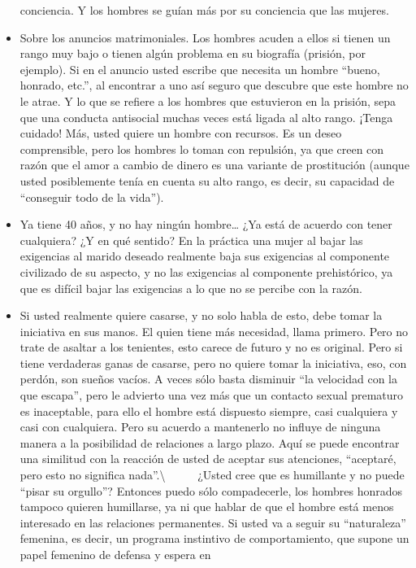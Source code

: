 \begin{itemize}
  conciencia. Y los hombres se guían más por su conciencia que las
  mujeres.
\item
  Sobre los anuncios matrimoniales. Los hombres acuden a ellos si tienen
  un rango muy bajo o tienen algún problema en su biografía (prisión,
  por ejemplo). Si en el anuncio usted escribe que necesita un hombre
  ``bueno, honrado, etc.'', al encontrar a uno así seguro que descubre
  que este hombre no le atrae. Y lo que se refiere a los hombres que
  estuvieron en la prisión, sepa que una conducta antisocial muchas
  veces está ligada al alto rango. ¡Tenga cuidado! Más, usted quiere un
  hombre con recursos. Es un deseo comprensible, pero los hombres lo
  toman con repulsión, ya que creen con razón que el amor a cambio de
  dinero es una variante de prostitución (aunque usted posiblemente
  tenía en cuenta su alto rango, es decir, su capacidad de ``conseguir
  todo de la vida'').
\item
  Ya tiene 40 años, y no hay ningún hombre\ldots{} ¿Ya está de acuerdo
  con tener cualquiera? ¿Y en qué sentido? En la práctica una mujer al
  bajar las exigencias al marido deseado realmente baja sus exigencias
  al componente civilizado de su aspecto, y no las exigencias al
  componente prehistórico, ya que es difícil bajar las exigencias a lo
  que no se percibe con la razón.
\item
  Si usted realmente quiere casarse, y no solo habla de esto, debe tomar
  la iniciativa en sus manos. El quien tiene más necesidad, llama
  primero. Pero no trate de asaltar a los tenientes, esto carece de
  futuro y no es original. Pero si tiene verdaderas ganas de casarse,
  pero no quiere tomar la iniciativa, eso, con perdón, son sueños
  vacíos. A veces sólo basta disminuir ``la velocidad con la que
  escapa'', pero le advierto una vez más que un contacto sexual
  prematuro es inaceptable, para ello el hombre está dispuesto siempre,
  casi cualquiera y casi con cualquiera. Pero su acuerdo a mantenerlo no
  influye de ninguna manera a la posibilidad de relaciones a largo
  plazo. Aquí se puede encontrar una similitud con la reacción de usted
  de aceptar sus atenciones, ``aceptaré, pero esto no significa
  nada''.\textbackslash{} ~ ~ ~ ¿Usted cree que es humillante y no puede
  ``pisar su orgullo''? Entonces puedo sólo compadecerle, los hombres
  honrados tampoco quieren humillarse, ya ni que hablar de que el hombre
  está menos interesado en las relaciones permanentes. Si usted va a
  seguir su ``naturaleza'' femenina, es decir, un programa instintivo de
  comportamiento, que supone un papel femenino de defensa y espera en

\end{itemize}
